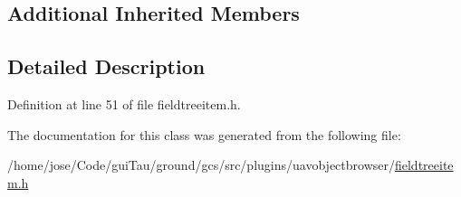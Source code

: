 \subsection*{Additional Inherited Members}


\subsection{Detailed Description}


Definition at line 51 of file fieldtreeitem.\-h.



The documentation for this class was generated from the following file\-:\begin{DoxyCompactItemize}
\item 
/home/jose/\-Code/gui\-Tau/ground/gcs/src/plugins/uavobjectbrowser/\hyperlink{fieldtreeitem_8h}{fieldtreeitem.\-h}\end{DoxyCompactItemize}
